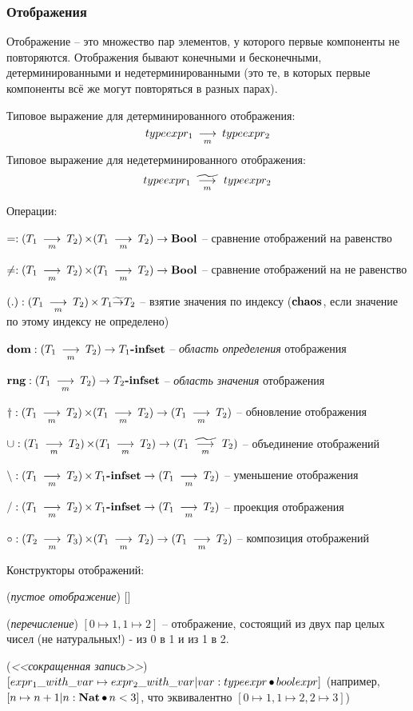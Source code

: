 \documentclass[14pt, twoside]{extreport}
\newcommand{\head}[1]{\vspace{1cm}\subsubsection*{#1}}
\begin{document}
\head{Отображения}
Отображение -- это множество пар элементов, у которого первые компоненты не повторяются. Отображения бывают конечными и бесконечными, детерминированными и недетерминированными (это те, в которых первые компоненты всё же могут повторяться в разных парах).

Типовое выражение для детерминированного отображения: $$typeexpr_1 \Map typeexpr_2$$ Типовое выражение для недетерминированного отображения: $$typeexpr_1 \NonDeterMap typeexpr_2$$

Операции:
\begin{list}{}{}
\item $=: (T_1 \Map T_2) \DP (T_1 \Map T_2) \Fn \Bool$ -- сравнение отображений на равенство
\item $\neq: (T_1 \Map T_2) \DP (T_1 \Map T_2) \Fn \Bool$ -- сравнение отображений на не равенство
\item $(.): (T_1 \Map T_2) \DP T_1 \NonDetermFn T_2$ -- взятие значения по индексу ($\Chaos$, если значение по этому индексу не
определено)
\item $\Dom: (T_1 \Map T_2) \Fn T_1\Infset$ -- \emph{область определения} отображения
\item $\Rng: (T_1 \Map T_2) \Fn T_2\Infset$ -- \emph{область значения} отображения
\item $\Upd: (T_1 \Map T_2) \DP (T_1 \Map T_2) \Fn (T_1 \Map T_2)$ -- обновление отображения
\item $\Union: (T_1 \Map T_2) \DP (T_1 \Map T_2) \Fn (T_1 \NonDeterMap T_2)$ -- объединение отображений
\item $\Minus: (T_1 \Map T_2) \DP T_1\Infset \Fn (T_1 \Map T_2)$ -- уменьшение отображения
\item $/: (T_1 \Map T_2) \DP T_1\Infset \Fn (T_1 \Map T_2)$ -- проекция отображения
\item $\Superp: (T_2 \Map T_3) \DP (T_1 \Map T_2) \Fn (T_1 \Map T_2)$ -- композиция отображений
\end{list}

Конструкторы отображений:
\begin{list}{}{}
\item (\emph{пустое отображение}) []
\item (\emph{перечисление}) $[0 \mapsto 1, 1 \mapsto 2]$ -- отображение, состоящий из двух пар целых чисел (не натуральных!) - из 0 в 1 и из 1 в 2.
\item (\emph{<<сокращенная запись>>}) $[expr_1\_with\_var \mapsto expr_2\_with\_var | var : typeexpr \SuchAs boolexpr]$ (например, $[n \mapsto n+1 | n : \Nat \SuchAs n < 3]$, что эквивалентно $[0 \mapsto 1, 1 \mapsto 2, 2 \mapsto 3]$)
\end{list}
\end{document}
